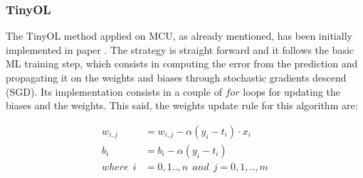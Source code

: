 \documentclass[12pt]{report}
\begin{document}
\subsubsection{TinyOL}
The TinyOL method applied on MCU, as already mentioned, has been initially implemented in paper \autocite{ren2021tinyol}. The strategy is straight forward and it follows the basic ML training step, which consists in computing the error from the prediction and propagating it on the weights and biases through stochastic gradients descend (SGD). Its implementation consists in a couple of $for$ loops for updating the biases and the weights. This said, the weights update rule for this algorithm are:

\begin{align}
    w_{i,j} &= w_{i,j} - \alpha (y_i - t_i) \cdot x_i \\
    b_i     &= b_i - \alpha (y_i - t_i) \\
    where \:\: i &= 0,1..,n  \: \: and \: \:  j=0,1,..,m \nonumber 
\end{align}
\end{document}
